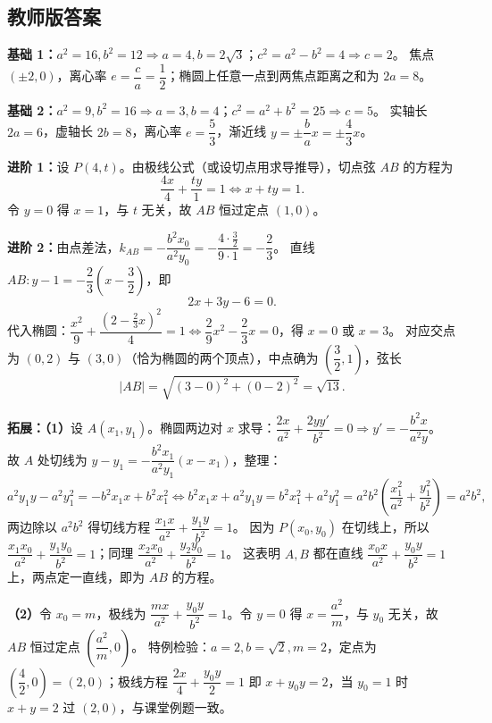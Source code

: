 \begin{afterclass}
\subsection*{教师版答案}
\begin{solution}
\textbf{基础 1：}$a^2=16,b^2=12\Rightarrow a=4,b=2\sqrt3$；$c^2=a^2-b^2=4\Rightarrow c=2$。
焦点 $(\pm2,0)$，离心率 $e=\dfrac ca=\dfrac12$；椭圆上任意一点到两焦点距离之和为 $2a=8$。
\end{solution}
\begin{solution}
\textbf{基础 2：}$a^2=9,b^2=16\Rightarrow a=3,b=4$；$c^2=a^2+b^2=25\Rightarrow c=5$。
实轴长 $2a=6$，虚轴长 $2b=8$，离心率 $e=\dfrac53$，渐近线 $y=\pm\dfrac{b}{a}x=\pm\dfrac43x$。
\end{solution}
\begin{solution}
\textbf{进阶 1：}设 $P(4,t)$。由极线公式（或设切点用求导推导），切点弦 $AB$ 的方程为
\[
  \frac{4x}{4}+\frac{ty}{1}=1\iff x+ty=1.
\]
令 $y=0$ 得 $x=1$，与 $t$ 无关，故 $AB$ 恒过定点 $(1,0)$。
\end{solution}
\begin{solution}
\textbf{进阶 2：}由点差法，$k_{AB}=-\dfrac{b^2x_0}{a^2y_0}=-\dfrac{4\cdot\frac32}{9\cdot1}=-\dfrac23$。
直线 $AB:y-1=-\dfrac23\left(x-\dfrac32\right)$，即
\[
  2x+3y-6=0.
\]
代入椭圆：$\dfrac{x^2}{9}+\dfrac{\left(2-\frac23x\right)^2}{4}=1
\iff \dfrac29x^2-\dfrac23x=0$，得 $x=0$ 或 $x=3$。
对应交点为 $(0,2)$ 与 $(3,0)$（恰为椭圆的两个顶点），中点确为 $\left(\dfrac32,1\right)$，弦长
\[
  |AB|=\sqrt{(3-0)^2+(0-2)^2}=\sqrt{13}.
\]
\end{solution}
\begin{solution}
\textbf{拓展：（1）}设 $A(x_1,y_1)$。椭圆两边对 $x$ 求导：$\dfrac{2x}{a^2}+\dfrac{2yy'}{b^2}=0\Rightarrow y'=-\dfrac{b^2x}{a^2y}$。
故 $A$ 处切线为 $y-y_1=-\dfrac{b^2x_1}{a^2y_1}(x-x_1)$，整理：
\[
  a^2y_1y-a^2y_1^2=-b^2x_1x+b^2x_1^2
  \iff b^2x_1x+a^2y_1y=b^2x_1^2+a^2y_1^2
  =a^2b^2\left(\frac{x_1^2}{a^2}+\frac{y_1^2}{b^2}\right)=a^2b^2,
\]
两边除以 $a^2b^2$ 得切线方程 $\dfrac{x_1x}{a^2}+\dfrac{y_1y}{b^2}=1$。
因为 $P(x_0,y_0)$ 在切线上，所以 $\dfrac{x_1x_0}{a^2}+\dfrac{y_1y_0}{b^2}=1$；同理 $\dfrac{x_2x_0}{a^2}+\dfrac{y_2y_0}{b^2}=1$。
这表明 $A,B$ 都在直线 $\dfrac{x_0x}{a^2}+\dfrac{y_0y}{b^2}=1$ 上，两点定一直线，即为 $AB$ 的方程。

\textbf{（2）}令 $x_0=m$，极线为 $\dfrac{mx}{a^2}+\dfrac{y_0y}{b^2}=1$。令 $y=0$ 得 $x=\dfrac{a^2}{m}$，与 $y_0$ 无关，故 $AB$ 恒过定点 $\left(\dfrac{a^2}{m},0\right)$。
特例检验：$a=2,b=\sqrt2,m=2$，定点为 $\left(\dfrac{4}{2},0\right)=(2,0)$；极线方程 $\dfrac{2x}{4}+\dfrac{y_0y}{2}=1$ 即 $x+y_0y=2$，当 $y_0=1$ 时 $x+y=2$ 过 $(2,0)$，与课堂例题一致。
\end{solution}
\end{afterclass}
